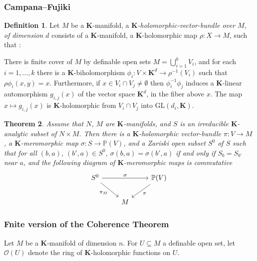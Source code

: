 \documentclass{amsart}
\newtheorem{theorem}{Theorem}[subsection]
\theoremstyle{definition}
\newtheorem{definition}[theorem]{Definition}
\numberwithin{equation}{section}
\begin{document}
\subsubsection{Campana--Fujiki}
\begin{definition}
	Let $M$ be a $\mathbf{K}$-manifold,
	a \emph{$\mathbf{K}$-holomorphic-vector-bundle over $M$,
		of dimension $d$} consists of a $\mathbf{K}$-manifold,
	a $\mathbf{K}$-holomorphic map $\rho: X \to M$,
	such that :

	There is finite cover of $M$ by definable open sets $M = \bigcup_{i=1}^k V_i$,
	and for each $i = 1,\dots,k$ there is a $\mathbf{K}$-biholomorphism
	$\phi_i: V \times \mathbf{K}^d \to \rho^{-1}(V_i)$ such that $\rho\phi_i(x,y) = x$.
	Furthermore, if $x \in V_i\cap V_j \neq\emptyset$ then $\phi_i^{-1}\phi_j$ induces
	a $\mathbf{K}$-linear automorphism $g_{i,j}(x)$ of the vector space $\mathbf{K}^d$,
	in the fiber above $x$.
	The map $x\mapsto g_{i,j}(x)$ is $\mathbf{K}$-holomorphic from $V_i\cap V_j$ into $\mathrm{GL}(d_i,\mathbf{K})$.
\end{definition}

\begin{tcolorbox}
	\begin{theorem}
		Assume that $N$, $M$ are $\mathbf{K}$-manifolds,
		and $S$ is an irreducible $\mathbf{K}$-analytic subset of $N \times M$.
		Then there is a $\mathbf{K}$-holomorphic vector-bundle
		$\pi: V \to M$, a $\mathbf{K}$-meromorphic map $\sigma: S \to \mathbb{P}(V)$,
		and a Zariski open subset $S^0$ of $S$ such that for all
		$(b,a)$, $(b',a)\in S^0$, $\sigma(b,a) = \sigma(b',a)$ if and only if
		$S_b = S_{b'}$ near $a$, and the following diagram of $\mathbf{K}$-meromorphic
		maps is commutative
		\[
			\begin{tikzcd}
				S^0 \ar[rr,"\sigma"]\ar[dr,"\pi_M"'] & & \mathbb{P}(V)\ar[dl,"\pi"] \\
				& M &
			\end{tikzcd}
		\]
	\end{theorem}
\end{tcolorbox}

\subsubsection{Fnite version of the Coherence Theorem}

Let $M$ be a $\mathbf{K}$-manifold of dimension $n$.
For $U \subseteq M$ a definable open set,
let $\mathcal{O}(U)$ denote the ring of $\mathbf{K}$-holomorphic functions on $U$.
\end{document}
